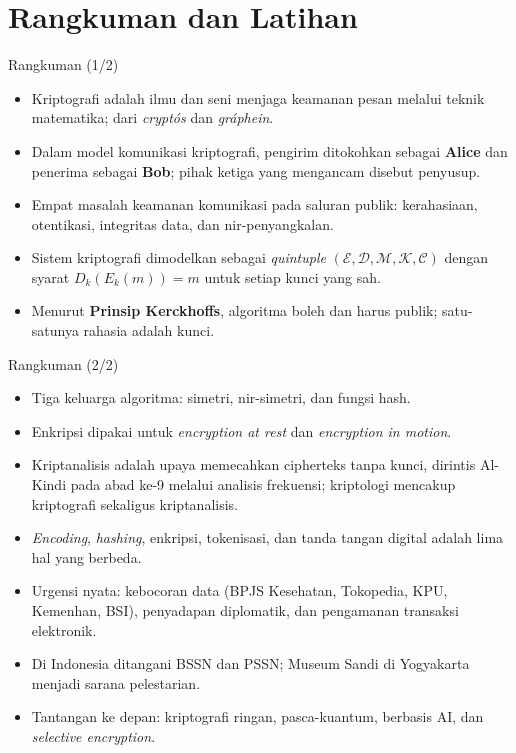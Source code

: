 \documentclass[aspectratio=169,11pt]{beamer}
\begin{document}
\section{Rangkuman dan Latihan}

\begin{frame}{Rangkuman (1/2)}
    \footnotesize
    \begin{itemize}
        \item Kriptografi adalah ilmu dan seni menjaga keamanan pesan melalui
              teknik matematika; dari \textit{crypt\'os} dan \textit{gr\'aphein}.
        \item Dalam model komunikasi kriptografi, pengirim ditokohkan sebagai
              \textbf{Alice} dan penerima sebagai \textbf{Bob}; pihak ketiga yang
              mengancam disebut penyusup.
        \item Empat masalah keamanan komunikasi pada saluran publik: kerahasiaan,
              otentikasi, integritas data, dan nir-penyangkalan.
        \item Sistem kriptografi dimodelkan sebagai \textit{quintuple}
              $(\mathcal{E},\mathcal{D},\mathcal{M},\mathcal{K},\mathcal{C})$
              dengan syarat $D_k(E_k(m)) = m$ untuk setiap kunci yang sah.
        \item Menurut \textbf{Prinsip Kerckhoffs}, algoritma boleh dan harus
              publik; satu-satunya rahasia adalah kunci.
    \end{itemize}
\end{frame}

\begin{frame}{Rangkuman (2/2)}
    \footnotesize
    \begin{itemize}
        \item Tiga keluarga algoritma: simetri, nir-simetri, dan fungsi hash.
        \item Enkripsi dipakai untuk \textit{encryption at rest} dan
              \textit{encryption in motion}.
        \item Kriptanalisis adalah upaya memecahkan cipherteks tanpa kunci,
              dirintis Al-Kindi pada abad ke-9 melalui analisis frekuensi;
              kriptologi mencakup kriptografi sekaligus kriptanalisis.
        \item \textit{Encoding}, \textit{hashing}, enkripsi, tokenisasi, dan tanda
              tangan digital adalah lima hal yang berbeda.
        \item Urgensi nyata: kebocoran data (BPJS Kesehatan, Tokopedia, KPU,
              Kemenhan, BSI), penyadapan diplomatik, dan pengamanan transaksi
              elektronik.
        \item Di Indonesia ditangani BSSN dan PSSN; Museum Sandi di Yogyakarta
              menjadi sarana pelestarian.
        \item Tantangan ke depan: kriptografi ringan, pasca-kuantum, berbasis AI,
              dan \textit{selective encryption}.
    \end{itemize}
\end{frame}
\end{document}
